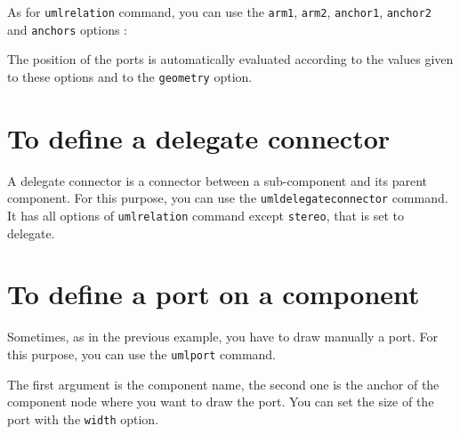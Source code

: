 \documentclass[a4paper,11pt]{report}
\newcommand{\inputTikZ}[1]{%
  }%
\newcommand{\inputTikZ}[1]{%
    \texttt{[image: fig/\#1.pdf]}%
  }%
\begin{document}
As for {\tt umlrelation} command, you can use the {\tt arm1}, {\tt arm2}, {\tt anchor1}, {\tt anchor2} and {\tt anchors} options :

\medskip

\begin{minipage}{0.45\textwidth}

\end{minipage}
\begin{minipage}{0.55\textwidth}
\begin{center}
\inputTikZ{componentassemblyconnectoradjust}
\end{center}
\end{minipage}

\medskip

The position of the ports is automatically evaluated according to the values given to these options and to the {\tt geometry} option.

\section{To define a delegate connector}

A delegate connector is a connector between a sub-component and its parent component. For this purpose, you can use the {\tt umldelegateconnector} command. It has all options of {\tt umlrelation} command except {\tt stereo}, that is set to delegate.

\medskip

\begin{minipage}{0.45\textwidth}

\end{minipage}
\begin{minipage}{0.55\textwidth}
\begin{center}
\inputTikZ{componentdelegateconnector}
\end{center}
\end{minipage}

\medskip

\section{To define a port on a component}

Sometimes, as in the previous example, you have to draw manually a port. For this purpose, you can use the {\tt umlport} command.

The first argument is the component name, the second one is the anchor of the component node where you want to draw the port. You can set the size of the port with the {\tt width} option.
\end{document}
